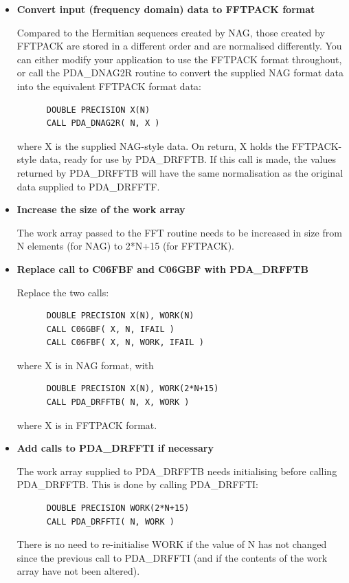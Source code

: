 \documentclass[11pt,twoside]{article}
\newcommand{\htmlref}[2]{#1}
\begin{document}
\begin{itemize}

\item{\bf Convert input (frequency domain) data to FFTPACK format}

   Compared to the Hermitian sequences created by NAG, those created by
   FFTPACK are stored in a different order and are normalised
   differently. You can either modify your application to use the
   FFTPACK format throughout, or call the
\htmlref{PDA\_DNAG2R}{PDA\_NAG2R}
   routine to convert the supplied NAG format data into the
   equivalent FFTPACK format data:

\begin{verbatim}
      DOUBLE PRECISION X(N)
      CALL PDA_DNAG2R( N, X )
\end{verbatim}

   where X is the supplied NAG-style data. On return, X holds the
   FFTPACK-style data, ready for use by PDA\_DRFFTB. If this call is made,
   the values returned by PDA\_DRFFTB will have the same normalisation as the
   original data supplied to PDA\_DRFFTF.

\item{\bf Increase the size of the work array}

   The work array passed to the FFT routine needs to be increased in
   size from N elements (for NAG) to 2*N+15 (for FFTPACK).

\item{\bf Replace call to C06FBF and C06GBF with
\htmlref{PDA\_DRFFTB}{PDA\_RFFTB}}

   Replace the two calls:

\begin{verbatim}
      DOUBLE PRECISION X(N), WORK(N)
      CALL C06GBF( X, N, IFAIL )
      CALL C06FBF( X, N, WORK, IFAIL )
\end{verbatim}

   where X is in NAG format, with

\begin{verbatim}
      DOUBLE PRECISION X(N), WORK(2*N+15)
      CALL PDA_DRFFTB( N, X, WORK )
\end{verbatim}

   where X is in FFTPACK format.

\item{\bf Add calls to
\htmlref{PDA\_DRFFTI}{PDA\_RFFTI}
   if necessary}

   The work array supplied to PDA\_DRFFTB needs initialising before calling
   PDA\_DRFFTB. This is done by calling PDA\_DRFFTI:

\begin{verbatim}
      DOUBLE PRECISION WORK(2*N+15)
      CALL PDA_DRFFTI( N, WORK )
\end{verbatim}

   There is no need to re-initialise WORK if the value of N has not
   changed since the previous call to PDA\_DRFFTI (and if the contents of the
   work array have not been altered).

\end{itemize}
\end{document}

